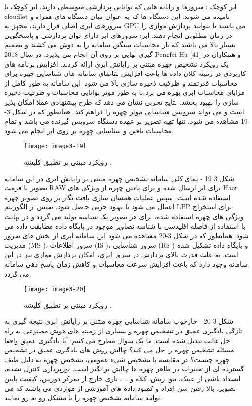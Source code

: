 ابر کوچک : سرورها و رایانه هایی که توانایی پردازشی متوسطی دارند، ابر کوچک یا cloudlet نامیده می شوند. این دستگاه ها که به عنوان میان دستگاه های همراه و سرورهای ابری اصلی قرار دارند، مجهز به GPU می باشند تا بتوانند پردازش موازی را در زمان مطلوبی انجام دهند.
ابر: سرورهای ابر دارای توان پردازشی و پاسخگویی بسیار بالا می باشند که بار محاسبات سنگین سامانه را به دوش می کشند و تصمیم گیری نهایی بر روی آن انجام می پذیرد.
در سال 2018 Pengfei Hu و همکاران در [41] یک رویکرد تشخیص چهره مبتنی بر رایانش ابری ارائه کردند. افزایش برنامه های کاربردی در زمینه کلان داده  ها باعث افزایش تقاضای سامانه های شناسایی چهره برای محاسبات قدرتمند و ظرفیت ذخیره سازی بالا می شود. این سامانه به طور کامل از مزایای محاسبات ابری بهره می برد تا به طور موثر توانایی محاسبات و ظرفیت ذخیره سازی را بهبود بخشد. نتایج تجربی نشان می دهد که طرح پیشنهادی عملا امکان-پذیر است و می تواند سرویس شناسایی موثر چهره را فراهم کند. همانطور که در شکل 3-19 مشاهده می شود، تنها تهیه تصویر بر عهده دستگاه سرویس گیرنده می باشد و تمام محاسبات یافتن و شناسایی چهره بر روی ابر انجام می شود.
 \begin{figure}[h]
\centering
  \texttt{[image: image3-19]}
  \caption{رویکرد مبتنی بر تطبیق کلیشه  \cite{ref1}.}
  \label{image2-1}
\end{figure}
شکل ‏3 19 - نمای کلی سامانه تشخیص چهره مبتنی بر رایانش ابری
در این سامانه تصویر با فرمت RAW برای ابر ارسال شده و برای یافتن چهره از ویژگی های Haar استفاده شده است. سپس عملیات همسان سازی بافت نگار بر روی تصویر چهره اعمال می شود تا بهبود جزیی حاصل شود. سپس از الگوریتم LBP  برای استخراج ویژگی های چهره استفاده شده، برای هر تصویر یک شناسه تولید می گردد و در نهایت با استفاده از فاصله اقلیدسی با شناسه تصاویر موجود در پایگاه داده مطابقت داده می شود. همانطور که در شکل 3-20 مشاهده می شود این سامانه ابری از بخش های سرور مدیریت (MS )، سرور اطلاعات (IS )، سرور شناسایی (RS ) و پایگاه داده تشکیل شده است. به علت قدرت بالای پردازش در سرور ابری، امکان پردازش موازی نیز در این سامانه وجود دارد که باعث افزایش سرعت محاسبات و کاهش زمان پاسخ دهی سامانه می گردد. 
 \begin{figure}[h]
\centering
  \texttt{[image: image3-20]}
  \caption{رویکرد مبتنی بر تطبیق کلیشه  \cite{ref1}.}
  \label{image2-1}
\end{figure}
شکل ‏3 20 - چارچوب سامانه شناسایی چهره مبتنی بر رایانش ابری
	نتیجه گیری
به تازگی یادگیری عمیق در تشخیص چهره و بسیاری از زمینه های هوش مصنوعی به راه حل غالب تبدیل شده است. ما یک سوال مطرح می کنیم: آیا یادگیری عمیق واقعا مسئله تشخیص چهره را حل می کند؟ چالش روش های یادگیری عمیق در تشخیص چهره چیست؟ 
در مقایسه با تشخیص شیء عمومی، تشخیص چهره به دلیل طیف گسترده ای از تغییرات در ظاهر چهره ها چالش برانگیز است. نورپردازی کنترل نشده، انسداد ناشی از عینک، مو، ریش، کلاه و... ، تاری خارج از تمرکز دوربین، کیفیت پایین تصویر، بالا رفتن سن افراد و کمبود داده های آموزشی از مواردی می باشند که می توانند سامانه تشخیص چهره را با مشکل رو به رو نمایند.
